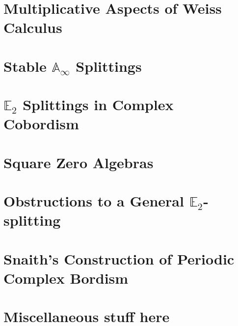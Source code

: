 \documentclass[reqno, oneside]{amsart}
\theoremstyle{definition}
\theoremstyle{plain}
\begin{document}


\section{Multiplicative Aspects of Weiss Calculus}



\section{Stable \texorpdfstring{$\mathbb{A}_\infty$}{Aoo} Splittings} \label{sec:AooSplit}



\section{\texorpdfstring{$\mathbb{E}_2$}{E2} Splittings in Complex Cobordism} \label{sec:MUE2}



\section{Square Zero Algebras}



\section{Obstructions to a General \texorpdfstring{$\mathbb{E}_2$}{E2}-splitting}



\section{Snaith's Construction of Periodic Complex Bordism} \label{sec:SnaithSplitting}


















\section{Miscellaneous stuff here}
\end{document}
